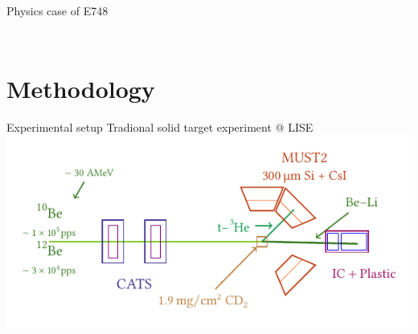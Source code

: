 \documentclass[aspectratio=43, dvipsnames]{beamer}
\newcommand{\iso}[2]{\ce{^{#1}#2}}
\newcommand{\overlap}[2]{\left\langle#1\middle\vert#2\right\rangle}
\begin{document}
\begin{frame}{Physics case of E748}
\begin{columns}[T]
\begin{column}{0.48\linewidth}
{                %
            }
        \end{column}
    \end{columns}
\end{frame}

\section{Methodology}
\begin{frame}[c]{Experimental setup}
    Tradional solid target experiment @ LISE
    \vspace{1.5em}
    \includegraphics[width=1\linewidth]{figures/setup.pdf}
\end{frame}
\end{document}

